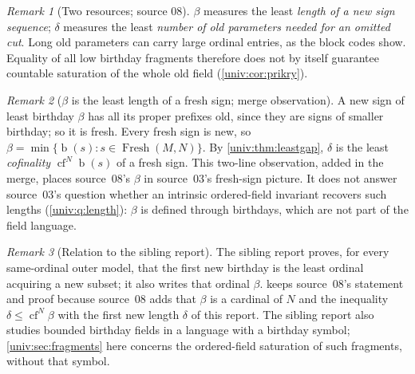 \documentclass[11pt,letterpaper]{article}
\numberwithin{equation}{section}
\theoremstyle{definition}
\theoremstyle{remark}
\newtheorem{remark}[remark]{Remark}
\newcommand{\bd}{\operatorname{b}}
\newcommand{\cf}{\operatorname{cf}}
\newcommand{\Fresh}{\operatorname{Fresh}}
\newcommand{\ZFC}{\mathsf{ZFC}}
\begin{document}
\begin{remark}[Two resources; source 08]
$\beta$ measures the least \emph{length of a new sign sequence}; $\delta$
measures the least \emph{number of old parameters needed for an omitted cut}.
Long old parameters can carry large ordinal entries, as the block codes show.
Equality of all low birthday fragments therefore does not by itself guarantee
countable saturation of the whole old field (\cref{univ:cor:prikry}).
\end{remark}

\begin{remark}[$\beta$ is the least length of a fresh sign; merge observation]\label{univ:rem:betafresh}
A new sign of least birthday $\beta$ has all its proper prefixes old, since
they are signs of smaller birthday; so it is fresh. Every fresh sign is new, so
$\beta=\min\{\bd(s):s\in\Fresh(M,N)\}$. By \cref{univ:thm:leastgap}, $\delta$
is the least \emph{cofinality} $\cf^N\bd(s)$ of a fresh sign. This two-line
observation, added in the merge, places source~08's $\beta$ in source~03's
fresh-sign picture. It does not answer source~03's question whether an
intrinsic ordered-field invariant recovers such lengths
(\cref{univ:q:length}): $\beta$ is defined through birthdays, which are not
part of the field language.
\end{remark}

\begin{remark}[Relation to the sibling report]\label{univ:rem:sibling}
The sibling report
proves, for every same-ordinal outer model, that the first new birthday is the
least ordinal acquiring a new subset; it also writes that ordinal $\beta$.
 keeps source~08's statement and
proof because source~08 adds that $\beta$ is a cardinal of $N$ and the
inequality $\delta\le\cf^N\beta$ with the first new length $\delta$ of this
report. The sibling report also studies bounded birthday fields in a language
with a birthday symbol; \cref{univ:sec:fragments} here concerns the
ordered-field saturation of such fragments, without that symbol.
\end{remark}

\noindent[Added 4 October 2026, batch~93: Section~41 of
\path{foundations-and-computation/definable-surreals-and-omnific-integers}
(its Part~III, batch-93 manuscript~06; AI-assisted, unrefereed, not
formalized) re-proves, for $N=V$ and a transitive inner model $M\ne V$ of
$\ZFC$ containing all ordinals, that the first new birthday is the least
ordinal acquiring a new subset and is a cardinal of $N$ and of $M$
(\path{dsn:op:sec:first-omissions}); a dated note there credits
\cref{univ:prop:beta}. The inequality $\delta\le\cf^N\beta$ is not re-proved
there.]
\end{document}
